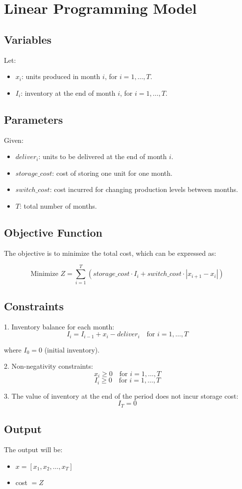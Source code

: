 \documentclass{article}
\begin{document}
\section*{Linear Programming Model}

\subsection*{Variables}
Let:
\begin{itemize}
    \item $x_i$: units produced in month $i$, for $i = 1, \ldots, T$.
    \item $I_i$: inventory at the end of month $i$, for $i = 1, \ldots, T$.
\end{itemize}

\subsection*{Parameters}
Given:
\begin{itemize}
    \item $deliver_i$: units to be delivered at the end of month $i$.
    \item $storage\_cost$: cost of storing one unit for one month.
    \item $switch\_cost$: cost incurred for changing production levels between months.
    \item $T$: total number of months.
\end{itemize}

\subsection*{Objective Function}
The objective is to minimize the total cost, which can be expressed as:

\[
\text{Minimize } Z = \sum_{i=1}^{T} (storage\_cost \cdot I_i + switch\_cost \cdot |x_{i+1} - x_i|)
\]

\subsection*{Constraints}

1. Inventory balance for each month:
\[
I_i = I_{i-1} + x_i - deliver_i \quad \text{for } i = 1, \ldots, T
\]

where \( I_0 = 0 \) (initial inventory).

2. Non-negativity constraints:
\[
x_i \geq 0 \quad \text{for } i = 1, \ldots, T
\]
\[
I_i \geq 0 \quad \text{for } i = 1, \ldots, T
\]

3. The value of inventory at the end of the period does not incur storage cost:
\[
I_T = 0
\]

\subsection*{Output}
The output will be:
\begin{itemize}
    \item \( x = [x_1, x_2, \ldots, x_T] \)
    \item cost \( = Z \)
\end{itemize}
\end{document}
